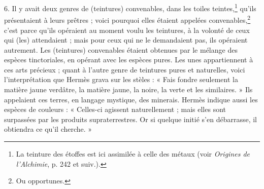 \documentclass[a4paper, 11pt, oneside, polutonikogreek, french]{article}
\begin{document}
6. Il y avait deux genres de (teintures) convenables, dans les toiles teintes,\footnote{La teinture des étoffes est ici assimilée à celle des métaux (voir \emph{Origines de l'Alchimie}, p. 242 et suiv.).} qu'ils présentaient à leurs prêtres ; voici pourquoi elles étaient appelées convenables,\footnote{Ou opportunes.} c'est parce qu'ils opéraient au moment voulu les teintures, à la volonté de ceux qui (les) attendaient ; mais pour ceux qui ne le demandaient pas, ils opéraient autrement. Les (teintures) convenables étaient obtenues par le mélange des espèces tinctoriales, en opérant avec les espèces pures. Les unes appartiennent à ces arts précieux ; quant à l'autre genre de teintures pures et naturelles, voici l'interprétation que Hermès grava sur les stèles : « Fais fondre seulement la matière jaune verdâtre, la matière jaune, la noire, la verte et les similaires. » Ils appelaient ces terres, en langage mystique, des minerais. Hermès indique aussi les espèces de couleurs : « Celles-ci agissent naturellement ; mais elles sont surpassées par les produits supraterrestres. Or si quelque initié s'en débarrasse, il obtiendra ce qu'il cherche. »
\end{document}
